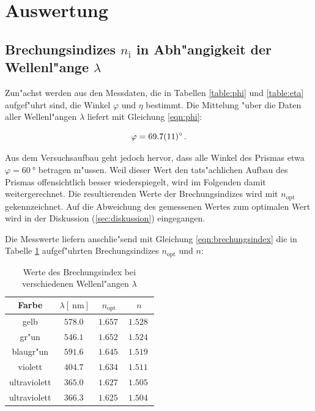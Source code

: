 \section{Auswertung}
\label{sec:auswertung}

	\subsection{Brechungsindizes $n_\mathrm{i}$ in Abh"angigkeit der Wellenl"ange $\lambda$}
	\label{subsec:brechungsindizes}
		Zun"achst werden aus den Messdaten, die in Tabellen \ref{table:phi} und \ref{table:eta} aufgef"uhrt sind, die Winkel $\varphi$ und $\eta$ bestimmt.
		Die Mittelung "uber die Daten aller Wellenl"angen $\lambda$ liefert mit Gleichung \eqref{eqn:phi}:

		\begin{equation*}
			\varphi = \SI{69.7 (11)}{\degree} \,.
		\end{equation*}

		Aus dem Versuchsaufbau geht jedoch hervor, dass alle Winkel des Prismas etwa $\varphi = \SI{60}{\degree}$ betragen m"ussen.
		Weil dieser Wert den tats"achlichen Aufbau des Prismas offensichtlich besser wiederspiegelt, wird im Folgenden damit weitergerechnet.
		Die resultierenden Werte der Brechungsindizes wird mit $n_\mathrm{opt}$ gekennzeichnet.
		Auf die Abweichung des gemessenen Wertes zum optimalen Wert wird in der Diskussion (\ref{sec:diskussion}) eingegangen.

		Die Messwerte liefern anschlie"send mit Gleichung \eqref{eqn:brechungsindex} die in Tabelle \ref{table:brechungsindizes} aufgef"uhrten Brechungsindizes $n_\mathrm{opt}$ und $n$:

		\begin{table}[h!]
			\begin{center}
				\caption{Werte des Brechungsindex bei verschiedenen Wellenl"angen $\lambda$ \label{table:brechungsindizes}}
				\begin{tabular}{|c|c|c|c|}
					\hline
						Farbe & $\lambda [\SI{}{\nano \meter}]$ & $n_\mathrm{opt}$ & $n$ \\
					\hline 
					\hline
						gelb & $\SI{578.0}{}$ & $\SI{1.657}{}$ & $\SI{1.528}{}$ \\
						gr"un & $\SI{546.1}{}$ & $\SI{1.652}{}$ & $\SI{1.524}{}$ \\
						blaugr"un & $\SI{591.6}{}$ & $\SI{1.645}{}$ & $\SI{1.519}{}$ \\
						violett & $\SI{404.7}{}$ & $\SI{1.634}{}$ & $\SI{1.511}{}$ \\
						ultraviolett & $\SI{365.0}{}$ & $\SI{1.627}{}$ & $\SI{1.505}{}$ \\
						ultraviolett & $\SI{366.3}{}$ & $\SI{1.625}{}$ & $\SI{1.504}{}$ \\
					\hline 
				\end{tabular}
			\end{center}
		\end{table}

